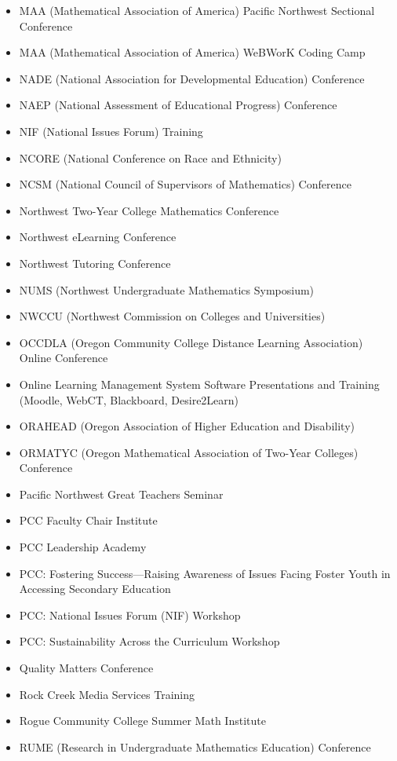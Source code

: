 \begin{itemize}[label={}]
\item MAA (Mathematical Association of America) Pacific Northwest Sectional Conference
\item MAA (Mathematical Association of America) WeBWorK Coding Camp
\item NADE (National Association for Developmental Education) Conference
\item NAEP (National Assessment of Educational Progress) Conference
\item NIF (National Issues Forum) Training
\item NCORE (National Conference on Race and Ethnicity)
\item NCSM (National Council of Supervisors of Mathematics) Conference
\item Northwest Two-Year College Mathematics Conference
\item Northwest eLearning Conference
\item Northwest Tutoring Conference
\item NUMS (Northwest Undergraduate Mathematics Symposium)
\item NWCCU (Northwest Commission on Colleges and Universities)
\item OCCDLA (Oregon Community College Distance Learning Association) Online Conference
\item Online Learning Management System Software Presentations and Training (Moodle, WebCT, Blackboard, Desire2Learn)
\item ORAHEAD (Oregon Association of Higher Education and Disability)
\item ORMATYC (Oregon Mathematical Association of Two-Year Colleges) Conference
\item Pacific Northwest Great Teachers Seminar
\item PCC Faculty Chair Institute
\item PCC Leadership Academy
\item PCC: Fostering Success---Raising Awareness of Issues Facing Foster Youth in Accessing Secondary Education
\item PCC: National Issues Forum (NIF) Workshop
\item PCC: Sustainability Across the Curriculum Workshop %
\item Quality Matters Conference
\item Rock Creek Media Services Training
\item Rogue Community College Summer Math Institute
\item RUME (Research in Undergraduate Mathematics Education) Conference

\end{itemize}
